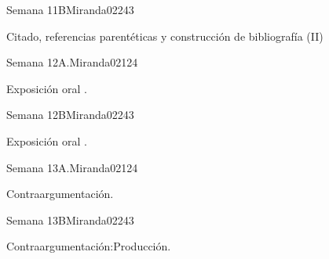 \begin{syllabus}
\begin{unit}{Semana 11B}{Miranda02}{24}{3}
   \begin{topics}
      \item Citado, referencias parentéticas y construcción de bibliografía (II)
   \end{topics}

   \begin{unitgoals}
      \item 
      \item
      \item 
      \end{unitgoals}
\end{unit}

\begin{unit}{Semana 12A.}{Miranda02}{12}{4}
   \begin{topics}
      \item Exposición oral .
   \end{topics}
   \begin{unitgoals}
      \item 
   \end{unitgoals}
\end{unit}

\begin{unit}{Semana 12B}{Miranda02}{24}{3}
   \begin{topics}
      \item Exposición oral .
   \end{topics}

   \begin{unitgoals}
      \item 
      \item
      \item 
      \end{unitgoals}
\end{unit}

\begin{unit}{Semana 13A.}{Miranda02}{12}{4}
   \begin{topics}
      \item Contraargumentación.
   \end{topics}
   \begin{unitgoals}
      \item 
   \end{unitgoals}
\end{unit}

\begin{unit}{Semana 13B}{Miranda02}{24}{3}
   \begin{topics}
      \item Contraargumentación:Producción.
   \end{topics}


\end{unit}
\end{syllabus}
